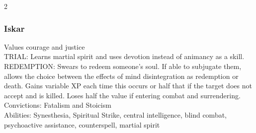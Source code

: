 \begin{multicols}{2}



\subsubsection{Iskar}

Values courage and justice \\

TRIAL: Learns martial spirit and uses devotion instead of animancy as a skill. \\

REDEMPTION: Swears to redeem someone's soul. If able to subjugate them, allows the choice between the effects of mind disintegration as redemption or death. Gains variable XP each time this occurs or half that if the target does not accept and is killed. Loses half the value if entering combat and surrendering. \\

Convictions: Fatalism and Stoicism \\

Abilities: Synesthesia, Spiritual Strike, central intelligence, blind combat, psychoactive assistance, counterspell, martial spirit \\







\end{multicols}
